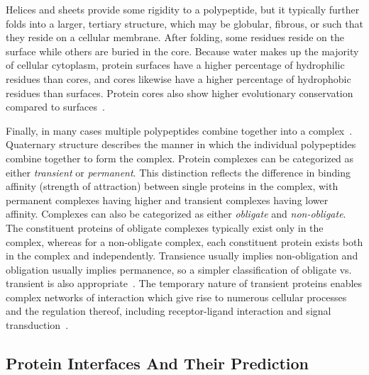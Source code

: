 Helices and sheets provide some rigidity to a polypeptide, but it typically further folds into a larger, tertiary structure, which may be globular, fibrous, or such that they reside on a cellular membrane.
After folding, some residues reside on the surface while others are buried in the core.
Because water makes up the majority of cellular cytoplasm, protein surfaces have a higher percentage of hydrophilic residues than cores, and cores likewise have a higher percentage of hydrophobic residues than surfaces. 
Protein cores also show higher evolutionary conservation compared to surfaces~\cite{yan2008}.


Finally, in many cases multiple polypeptides combine together into a complex~\cite{scheeffink2003}.
Quaternary structure describes the manner in which the individual polypeptides combine together to form the complex.
Protein complexes can be categorized as either \textit{transient} or \textit{permanent}.
This distinction reflects the difference in binding affinity (strength of attraction) between single proteins in the complex, with permanent complexes having higher and transient complexes having lower affinity.
Complexes can also be categorized as either \textit{obligate} and \textit{non-obligate}.
The constituent proteins of obligate complexes typically exist only in the complex, whereas for a non-obligate complex, each constituent protein exists both in the complex and independently.
Transience usually implies non-obligation and obligation usually implies permanence, so a simpler classification of obligate vs. transient is also appropriate~\cite{jones1996}\cite{perkins2010}.
The temporary nature of transient proteins enables complex networks of interaction which give rise to numerous cellular processes and the regulation thereof, including receptor-ligand interaction and signal transduction~\cite{perkins2010}\cite{ofran2003}.


\subsection{Protein Interfaces And Their Prediction}



